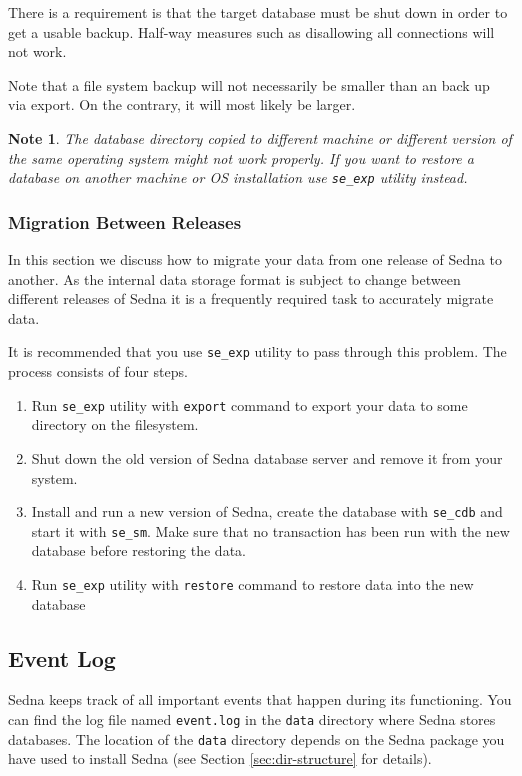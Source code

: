 \documentclass[a4paper,12pt]{article}
\newtheorem{note}{Note}
\begin{document}
There is a requirement is that the target database must be shut down in order to get a usable backup.
Half-way measures such as disallowing all connections will not work.

Note that a file system backup will not necessarily be smaller than an back up via export. On 
the contrary, it will most likely be larger.

\begin{note}
The database directory copied to different machine or different version of the same operating system 
might not work properly. If you want to restore a database on another machine or OS installation use
\verb!se_exp! utility instead.
\end{note}


\subsubsection{Migration Between Releases}

In this section we discuss how to migrate your data from one release of Sedna to another. 
As the internal data storage format is subject to change between different releases of Sedna it is a 
frequently required task to accurately migrate data.  

It is recommended that you use \verb!se_exp! utility to pass through this problem. The process 
consists of four steps.

\begin{enumerate}
\item
Run \verb!se_exp! utility with \verb!export! command to export your data to some 
directory on the filesystem.
\item
Shut down the old version of Sedna database server and remove it from your system. 
\item
Install and run a new version of Sedna, create the database with \verb!se_cdb! and start it with 
\verb!se_sm!. Make sure that no transaction has been run with the new database before restoring 
the data.
\item
Run \verb!se_exp! utility with \verb!restore! command to restore data into the new database
\end{enumerate}

\subsection{Event Log}
Sedna keeps track of all important events that happen during its functioning. You can find the log file named \verb!event.log! in the \verb!data! directory where Sedna stores databases. The location of the \verb!data! directory depends on the Sedna package you have used to install Sedna (see Section \ref{sec:dir-structure} for details).
\end{document}
